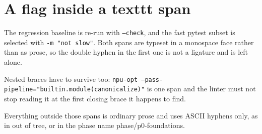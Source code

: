 \section{A flag inside a texttt span}

The regression baseline is re-run with \texttt{--check}, and the fast pytest
subset is selected with \texttt{-m "not slow"}. Both spans are typeset in a
monospace face rather than as prose, so the double hyphen in the first one is
not a ligature and is left alone.

Nested braces have to survive too: \texttt{npu-opt --pass-pipeline="builtin.module(canonicalize)"}
is one span and the linter must not stop reading it at the first closing brace
it happens to find.

Everything outside those spans is ordinary prose and uses ASCII hyphens only,
as in out of tree, or in the phase name phase/p0-foundations.
